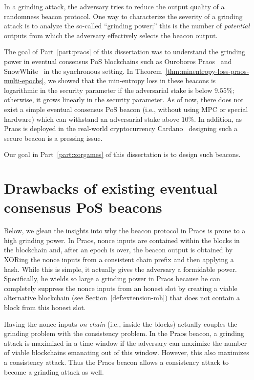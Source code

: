 
In a grinding attack, 
the adversary tries to reduce the output quality 
of a randomness beacon protocol.
One way to characterize the severity of a grinding attack 
is to analyze the so-called ``grinding power;'' 
this is the number of \emph{potential} outputs 
from which the adversary effectively selects the beacon output.

The goal of Part~\ref{part:praos} of this dissertation was to understand the grinding power in 
eventual consensus PoS blockchains such as 
Ouroboros Praos~\cite{Praos} and SnowWhite~\cite{SnowWhite} 
in the synchronous setting. 
In Theorem~\ref{thm:minentropy-loss-praos-multi-epochs}, 
we showed that the min-entropy loss in these beacons  
is logarithmic in the security parameter if the adversarial stake is below $9.55\%$; 
otherwise, it grows linearly in the security parameter. 
As of now, there does not exist a simple eventual consensus PoS beacon (i.e., without using MPC or special hardware) 
which can withstand an adversarial stake above $10\%$. 
In addition, as Praos is deployed in the real-world cryptocurrency Cardano~\cite{Cardano,CardanoPraos} 
designing such a secure beacon is a pressing issue.

Our goal in Part~\ref{part:xorgames} of this dissertation is 
to design such beacons.







\section{Drawbacks of existing eventual consensus PoS beacons}  
    Below, we glean the insights into why the beacon protocol in Praos 
    is prone to a high grinding power. 
    In Praos, 
    nonce inputs are contained within the blocks in the blockchain 
    and, after an epoch is over, 
    the beacon output is obtained by XORing the nonce inputs from a consistent chain prefix 
    and then applying a hash.
    While this is simple, 
    it actually gives the adversary a formidable power. 
    Specifically, he wields so large a grinding power in Praos 
    because 
    he can completely suppress the nonce inputs from an honest slot 
    by creating a viable alternative blockchain (see Section~\ref{def:extension-mh}) 
    that does not contain a block from this honest slot. 

    Having the nonce inputs \emph{on-chain} (i.e., inside the blocks)
    actually couples the grinding problem with the consistency problem. 
    In the Praos beacon, a grinding attack is maximized in a time window 
    if the adversary can maximize the number of viable blockchains emanating out of this window. 
    However, this also maximizes a consistency attack. 
    Thus the Praos beacon allows a consistency attack to 
    become a grinding attack as well.

